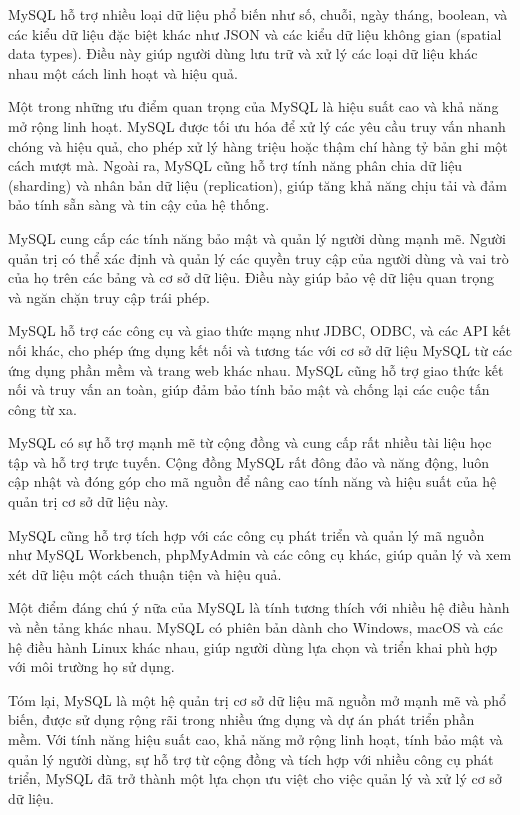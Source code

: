 MySQL hỗ trợ nhiều loại dữ liệu phổ biến như số, chuỗi, ngày tháng, boolean, và các kiểu dữ liệu đặc biệt khác như JSON và các kiểu dữ liệu không gian (spatial data types). Điều này giúp người dùng lưu trữ và xử lý các loại dữ liệu khác nhau một cách linh hoạt và hiệu quả.

Một trong những ưu điểm quan trọng của MySQL là hiệu suất cao và khả năng mở rộng linh hoạt. MySQL được tối ưu hóa để xử lý các yêu cầu truy vấn nhanh chóng và hiệu quả, cho phép xử lý hàng triệu hoặc thậm chí hàng tỷ bản ghi một cách mượt mà. Ngoài ra, MySQL cũng hỗ trợ tính năng phân chia dữ liệu (sharding) và nhân bản dữ liệu (replication), giúp tăng khả năng chịu tải và đảm bảo tính sẵn sàng và tin cậy của hệ thống.

MySQL cung cấp các tính năng bảo mật và quản lý người dùng mạnh mẽ. Người quản trị có thể xác định và quản lý các quyền truy cập của người dùng và vai trò của họ trên các bảng và cơ sở dữ liệu. Điều này giúp bảo vệ dữ liệu quan trọng và ngăn chặn truy cập trái phép.

MySQL hỗ trợ các công cụ và giao thức mạng như JDBC, ODBC, và các API kết nối khác, cho phép ứng dụng kết nối và tương tác với cơ sở dữ liệu MySQL từ các ứng dụng phần mềm và trang web khác nhau. MySQL cũng hỗ trợ giao thức kết nối và truy vấn an toàn, giúp đảm bảo tính bảo mật và chống lại các cuộc tấn công từ xa.

MySQL có sự hỗ trợ mạnh mẽ từ cộng đồng và cung cấp rất nhiều tài liệu học tập và hỗ trợ trực tuyến. Cộng đồng MySQL rất đông đảo và năng động, luôn cập nhật và đóng góp cho mã nguồn để nâng cao tính năng và hiệu suất của hệ quản trị cơ sở dữ liệu này.

MySQL cũng hỗ trợ tích hợp với các công cụ phát triển và quản lý mã nguồn như MySQL Workbench, phpMyAdmin và các công cụ khác, giúp quản lý và xem xét dữ liệu một cách thuận tiện và hiệu quả.

Một điểm đáng chú ý nữa của MySQL là tính tương thích với nhiều hệ điều hành và nền tảng khác nhau. MySQL có phiên bản dành cho Windows, macOS và các hệ điều hành Linux khác nhau, giúp người dùng lựa chọn và triển khai phù hợp với môi trường họ sử dụng.

Tóm lại, MySQL là một hệ quản trị cơ sở dữ liệu mã nguồn mở mạnh mẽ và phổ biến, được sử dụng rộng rãi trong nhiều ứng dụng và dự án phát triển phần mềm. Với tính năng hiệu suất cao, khả năng mở rộng linh hoạt, tính bảo mật và quản lý người dùng, sự hỗ trợ từ cộng đồng và tích hợp với nhiều công cụ phát triển, MySQL đã trở thành một lựa chọn ưu việt cho việc quản lý và xử lý cơ sở dữ liệu.


